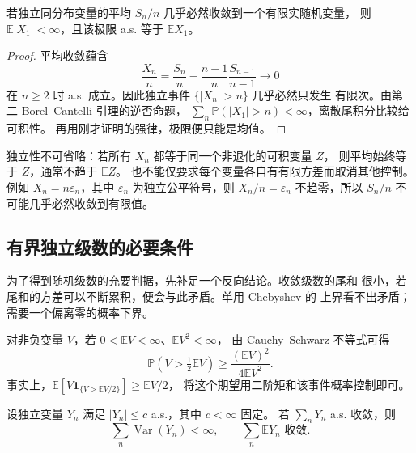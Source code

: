 \begin{proposition}[可积性的必要性]
\label{prop:iid-finite-average-necessity}
若独立同分布变量的平均 $S_n/n$ 几乎必然收敛到一个有限实随机变量，
则 $\mathbb E|X_1|<\infty$，且该极限 a.s. 等于 $\mathbb E X_1$。
\end{proposition}

\begin{proof}
平均收敛蕴含
\[
 \frac{X_n}{n}=\frac{S_n}{n}
       -\frac{n-1}{n}\frac{S_{n-1}}{n-1}\longrightarrow0
\]
在 $n\ge2$ 时 a.s. 成立。因此独立事件 $\{|X_n|>n\}$ 几乎必然只发生
有限次。由第二 Borel--Cantelli 引理的逆否命题，
$\sum_n\mathbb P(|X_1|>n)<\infty$，离散尾积分比较给可积性。
再用刚才证明的强律，极限便只能是均值。
\end{proof}

独立性不可省略：若所有 $X_n$ 都等于同一个非退化的可积变量 $Z$，
则平均始终等于 $Z$，通常不趋于 $\mathbb E Z$。
也不能仅要求每个变量各自有有限方差而取消其他控制。例如
$X_n=n\varepsilon_n$，其中 $\varepsilon_n$ 为独立公平符号，则
$X_n/n=\varepsilon_n$ 不趋零，所以 $S_n/n$ 不可能几乎必然收敛到有限值。

\subsection{有界独立级数的必要条件}

为了得到随机级数的充要判据，先补足一个反向结论。收敛级数的尾和
很小，若尾和的方差可以不断累积，便会与此矛盾。单用 Chebyshev 的
上界看不出矛盾；需要一个偏离零的概率下界。

对非负变量 $V$，若 $0<\mathbb E V<\infty$、$\mathbb E V^2<\infty$，
由 Cauchy--Schwarz 不等式可得
\begin{equation}
\label{eq:paley-zygmund-half}
 \mathbb P(V>\tfrac12\mathbb EV)
 \ge\frac{(\mathbb EV)^2}{4\mathbb E V^2}.
\end{equation}
事实上，$\mathbb E[V\mathbf1_{\{V>\mathbb EV/2\}}]\ge\mathbb EV/2$，
将这个期望用二阶矩和该事件概率控制即可。

\begin{lemma}
\label{lem:bounded-independent-series-necessity}
设独立变量 $Y_n$ 满足 $|Y_n|\le c$ a.s.，其中 $c<\infty$ 固定。
若 $\sum_nY_n$ a.s. 收敛，则
\[
 \sum_n\operatorname{Var}(Y_n)<\infty,
 \qquad \sum_n\mathbb E Y_n\text{ 收敛}.
\]
\end{lemma}

